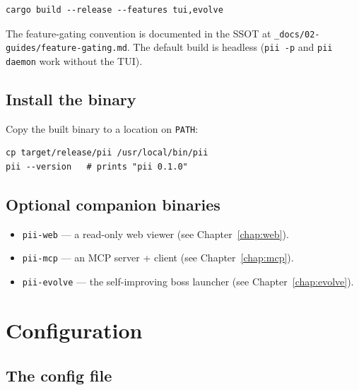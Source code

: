 \documentclass[
	fontsize=10pt,
	twoside=false,
	secnumdepth=2,
	open=any,
]{kaobook}
\begin{document}
\begin{cmdbox}
\begin{lstlisting}
cargo build --release --features tui,evolve
\end{lstlisting}
\end{cmdbox}

The feature-gating convention is documented in the SSOT at
\texttt{\_docs/02-guides/feature-gating.md}. The default build is headless
(\texttt{pii -p} and \texttt{pii daemon} work without the TUI).

\section{Install the binary}

Copy the built binary to a location on \texttt{PATH}:

\begin{cmdbox}[Install]
\begin{lstlisting}
cp target/release/pii /usr/local/bin/pii
pii --version   # prints "pii 0.1.0"
\end{lstlisting}
\end{cmdbox}

\section{Optional companion binaries}

\begin{itemize}
    \item \texttt{pii-web} — a read-only web viewer (see
        Chapter~\ref{chap:web}).
    \item \texttt{pii-mcp} — an MCP server + client (see
        Chapter~\ref{chap:mcp}).
    \item \texttt{pii-evolve} — the self-improving boss launcher (see
        Chapter~\ref{chap:evolve}).
\end{itemize}

\chapter{Configuration}
\label{chap:config}

\section{The config file}
\end{document}
